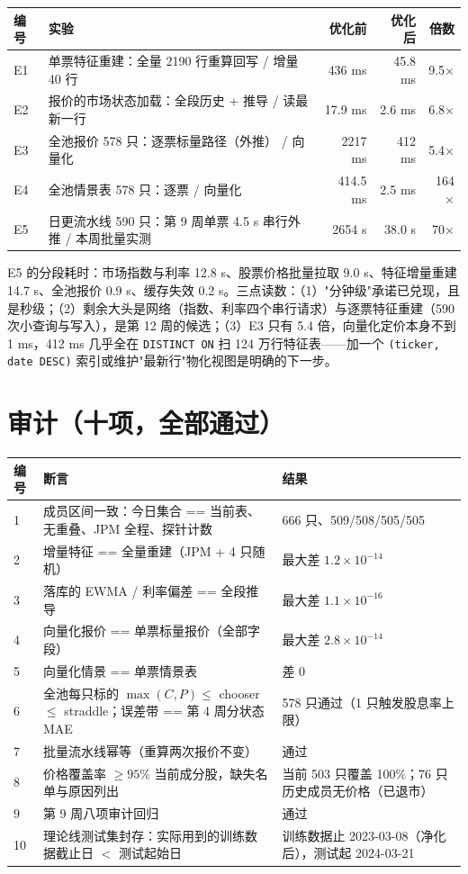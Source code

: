 \documentclass[11pt]{ctexart}
\begin{document}
\begin{center}\small
\begin{tabular}{p{0.9cm}p{6.6cm}rrr}
\toprule
编号 & 实验 & 优化前 & 优化后 & 倍数 \\
\midrule
E1 & 单票特征重建：全量 2190 行重算回写 / 增量 40 行 & 436 ms & 45.8 ms & 9.5$\times$ \\
E2 & 报价的市场状态加载：全段历史 + 推导 / 读最新一行 & 17.9 ms & 2.6 ms & 6.8$\times$ \\
E3 & 全池报价 578 只：逐票标量路径（外推） / 向量化 & 2217 ms & 412 ms & 5.4$\times$ \\
E4 & 全池情景表 578 只：逐票 / 向量化 & 414.5 ms & 2.5 ms & 164$\times$ \\
E5 & 日更流水线 590 只：第 9 周单票 4.5 s 串行外推 / 本周批量实测 & 2654 s & 38.0 s & 70$\times$ \\
\bottomrule
\end{tabular}
\end{center}

E5 的分段耗时：市场指数与利率 12.8 s、股票价格批量拉取 9.0 s、特征增量重建 14.7 s、全池报价 0.9 s、缓存失效 0.2 s。三点读数：（1）"分钟级"承诺已兑现，且是秒级；（2）剩余大头是网络（指数、利率四个串行请求）与逐票特征重建（590 次小查询与写入），是第 12 周的候选；（3）E3 只有 5.4 倍，向量化定价本身不到 1 ms，412 ms 几乎全在 \texttt{DISTINCT ON} 扫 124 万行特征表——加一个 \texttt{(ticker, date DESC)} 索引或维护"最新行"物化视图是明确的下一步。

\section{审计（十项，全部通过）}

\begin{center}\small
\begin{tabular}{p{0.8cm}p{7.8cm}p{6.4cm}}
\toprule
编号 & 断言 & 结果 \\
\midrule
1 & 成员区间一致：今日集合 == 当前表、无重叠、JPM 全程、探针计数 & 666 只、509/508/505/505 \\
2 & 增量特征 == 全量重建（JPM + 4 只随机） & 最大差 $1.2\times10^{-14}$ \\
3 & 落库的 EWMA / 利率偏差 == 全段推导 & 最大差 $1.1\times10^{-16}$ \\
4 & 向量化报价 == 单票标量报价（全部字段） & 最大差 $2.8\times10^{-14}$ \\
5 & 向量化情景 == 单票情景表 & 差 0 \\
6 & 全池每只标的 $\max(C,P)\le$ chooser $\le$ straddle；误差带 == 第 4 周分状态 MAE & 578 只通过（1 只触发股息率上限） \\
7 & 批量流水线幂等（重算两次报价不变） & 通过 \\
8 & 价格覆盖率 $\ge 95\%$ 当前成分股，缺失名单与原因列出 & 当前 503 只覆盖 100\%；76 只历史成员无价格（已退市） \\
9 & 第 9 周八项审计回归 & 通过 \\
10 & 理论线测试集封存：实际用到的训练数据截止日 $<$ 测试起始日 & 训练数据止 2023-03-08（净化后），测试起 2024-03-21 \\
\bottomrule
\end{tabular}
\end{center}
\end{document}
